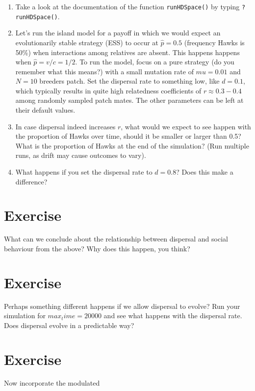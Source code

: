 \documentclass[
]{book}
\begin{document}
\begin{enumerate}
\def\labelenumi{\arabic{enumi}.}
\item
  Take a look at the documentation of the function \texttt{runHDSpace()} by typing \texttt{?runHDSpace()}.
\item
  Let's run the island model for a payoff in which we would expect an evolutionarily stable strategy (ESS) to occur at \(\hat{p}=0.5\) (frequency Hawks is 50\%) when interactions among relatives are absent. This happens happens when \(\hat{p} = v/c = 1/2\). To run the model, focus on a pure strategy (do you remember what this means?) with a small mutation rate of \(mu=0.01\) and \(N=10\) breeders patch. Set the dispersal rate to something low, like \(d=0.1\), which typically results in quite high relatedness coefficients of \(r\approx 0.3-0.4\) among randomly sampled patch mates. The other parameters can be left at their default values.
\item
  In case dispersal indeed increases \(r\), what would we expect to see happen with the proportion of Hawks over time, should it be smaller or larger than 0.5? What is the proportion of Hawks at the end of the simulation? (Run multiple runs, as drift may cause outcomes to vary).
\item
  What happens if you set the dispersal rate to \(d=0.8\)? Does this make a difference?
\end{enumerate}

\hypertarget{exercise-9}{%
\section{Exercise}\label{exercise-9}}

What can we conclude about the relationship between dispersal and social behaviour from the above? Why does this happen, you think?

\hypertarget{exercise-10}{%
\section{Exercise}\label{exercise-10}}

Perhaps something different happens if we allow dispersal to evolve? Run your simulation for \(max_time = 20000\) and see what happens with the dispersal rate. Does dispersal evolve in a predictable way?

\hypertarget{exercise-11}{%
\section{Exercise}\label{exercise-11}}

Now incorporate the modulated
\end{document}
